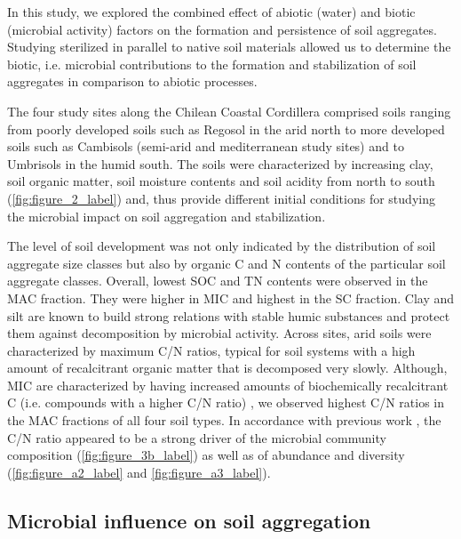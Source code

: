 In this study, we explored the combined effect of abiotic (water) and biotic (microbial activity) factors on the formation and persistence of soil aggregates. 
Studying sterilized in parallel to native soil materials allowed us to determine the biotic, i.e. microbial contributions to the formation and stabilization of soil aggregates in comparison to abiotic processes.

The four study sites along the Chilean Coastal Cordillera comprised soils ranging from poorly developed soils such as Regosol in the arid north to more developed soils such as Cambisols (semi-arid and mediterranean study sites) and to Umbrisols in the humid south. 
The soils were characterized by increasing clay, soil organic matter, soil moisture contents and soil acidity from north to south \citep{Bernhard2018b} (\cref{fig:figure_2_label}) and, thus provide different initial conditions for studying the microbial impact on soil aggregation and stabilization.

The level of soil development was not only indicated by the distribution of soil aggregate size classes but also by organic C and N contents of the particular soil aggregate classes. 
Overall, lowest SOC and TN contents were observed in the MAC fraction. 
They were higher in MIC and highest in the SC fraction. 
Clay and silt are known to build strong relations with stable humic substances \citep{Bouajila2021} and protect them against decomposition by microbial activity. 
Across sites, arid soils were characterized by maximum C/N ratios, typical for soil systems with a high amount of recalcitrant organic matter that is decomposed very slowly. 
Although, MIC are characterized by having increased amounts of biochemically recalcitrant C (i.e. compounds with a higher C/N ratio) \citep{Elliott1986, Kravchenko2015}, we observed highest C/N ratios in the MAC fractions of all four soil types. 
In accordance with previous work \citep{Kuramae2012}, the C/N ratio appeared to be a strong driver of the microbial community composition (\cref{fig:figure_3b_label}) as well as of abundance and diversity (\cref{fig:figure_a2_label} and \cref{fig:figure_a3_label}).

\subsection{Microbial influence on soil aggregation}

